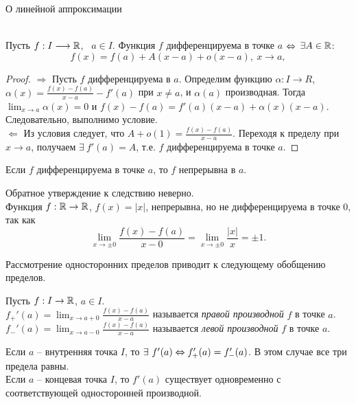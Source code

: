 \begin{theorem}\hypertarget{th1}{О линейной аппроксимации}
    \\
    Пусть $f: I \longrightarrow \mathbb{R}$, \ $a \in I$.
    Функция $f$ дифференцируема в точке $a$ $\Leftrightarrow$ $\exists A \in \mathbb{R}$:
    \[f(x) = f(a) + A(x - a) + o(x - a), \ x \longrightarrow a,\]
\end{theorem}

\begin{proof}
    $\Rightarrow$ Пусть $f$ дифференцируема в $a$. Определим функцию $\alpha: I \rightarrow R$, $\alpha(x) = \frac{f(x) - f(a)}{x - a} - f'(a)$ при $ x \neq a$, и $\alpha(a)$ производная.
    Тогда $\lim_{x \to a} \alpha(x) = 0$ и $f(x) - f(a) = f'(a)(x - a) + \alpha(x)(x - a)$. Следовательно, выполнимо условие.
    \\
    $\Leftarrow$ Из условия следует, что $A + o(1) = \frac{f(x) - f(a)}{x - a}$. Переходя к пределу при $x \to a$, получаем $\exists \ f'(a) = A$, т.е. $f$ дифференцируема в точке $a$.
\end{proof}

\begin{corollary}
    Если $f$ дифференцируема в точке $a$, то $f$ непрерывна в $a$.
\end{corollary}

\begin{note}
    Обратное утверждение к следствию неверно.
    \\
    Функция $f: \mathbb{R} \to \mathbb{R}$, $f(x) = |x|$, непрерывна, но не дифференцируема в точке 0, так как
    \[\lim_{x \to \pm 0} \frac{f(x) - f(a)}{x - 0} = \lim_{x \to \pm 0} \frac{|x|}{x} = \pm 1.\]
\end{note}

Рассмотрение односторонних пределов приводит к следующему обобщению пределов.

\begin{definition}
    Пусть $f: I \to \mathbb{R}$, $a \in I$.
    \\
    $f_{+}'(a) = \lim_{x \to a + 0} \frac{f(x) - f(a)}{x - a}$ называется \textit{правой производной} $f$ в точке $a$.
    \\
    $f_{-}'(a) = \lim_{x \to a - 0} \frac{f(x) - f(a)}{x - a}$ называется \textit{левой производной} $f$ в точке $a$.
\end{definition}

\begin{note}
    Если $a$ -- внутренняя точка $I$, то $\exists \ f'(a) \Leftrightarrow f_{+}'(a) = f_{-}'(a)$. В этом случае все три предела равны.
    \\
    Если $a$ -- концевая точка $I$, то $f'(a)$ существует одновременно с соответствующей односторонней производной.
\end{note}

